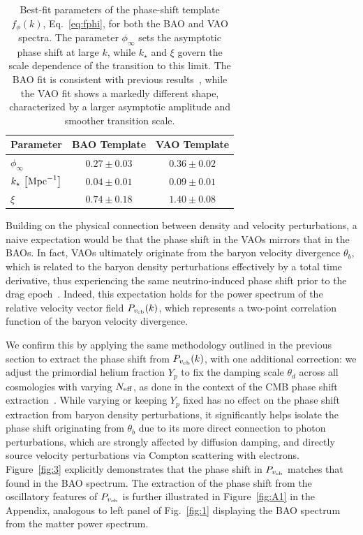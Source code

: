 \documentclass[floats,floatfix,showpacs,amssymb,prd,twocolumn,superscriptaddress,nofootinbib,reprint,preprintnumbers]{revtex4-2}
\begin{document}
\begin{table}
	\centering
	\begin{tabular}{l c @{\hskip 1em} c}
			\toprule
		Parameter 				& {BAO Template} & 							{VAO Template}								\\
			\midrule[0.065em]
		$\phi_\infty$ 				& $0.27 \pm 0.03$ & $0.36 \pm 0.02$				 		\\
		$k_\star\,\left[\rm{Mpc}^{-1}\right]$				& $0.04 \pm 0.01$ &	 $0.09 \pm 0.01$				\\
		$\xi$ 		& $0.74\pm 0.18$ & $1.40\pm 0.08$ \\

			\bottomrule
	\end{tabular}
	\caption{Best-fit parameters of the phase-shift template $f_\phi(k)$, Eq.~\eqref{eq:fphi}, for both the BAO and VAO spectra. The parameter $\phi_\infty$ sets the asymptotic phase shift at large $k$, while $k_\star$ and $\xi$ govern the scale dependence of the transition to this limit. The BAO fit is consistent with previous results~\cite{Baumann:2017gkg}, while the VAO fit shows a markedly different shape, characterized by a larger asymptotic amplitude and smoother transition scale.}
\label{tab:phase_templates}
\end{table}


\noindent Building on the physical connection between density and velocity perturbations, a naive expectation would be that the phase shift in the VAOs mirrors that in the BAOs. In fact, VAOs ultimately originate from the baryon velocity divergence $\theta_b$, which is related to the baryon density perturbations effectively by a total time derivative, thus experiencing the same neutrino-induced phase shift prior to the drag epoch~\cite{Green:2020fjb, Montefalcone:2025unv}. Indeed, this expectation holds for the power spectrum of the relative velocity vector field $P_{v_{\rm cb}}(k)$, which represents a two-point correlation function of the baryon velocity divergence. 

We confirm this by applying the same methodology outlined in the previous section to extract the phase shift from $P_{v_{\rm cb}}(k)$, with one additional correction: we adjust the primordial helium fraction $Y_p$ to fix the damping scale $\theta_d$ across all cosmologies with varying $N_{\rm eff}$, as done in the context of the CMB phase shift extraction~\cite{Follin:2015hya, Montefalcone:2025unv}. While varying or keeping $Y_p$ fixed has no effect on the phase shift extraction from baryon density perturbations, it significantly helps isolate the phase shift originating from $\theta_b$ due to its more direct connection to photon perturbations, which are strongly affected by diffusion damping, and directly source velocity perturbations via Compton scattering with electrons. Figure~\ref{fig:3} explicitly demonstrates that the phase shift in $P_{v_{\rm cb}}$ matches that found in the BAO spectrum. The extraction of the phase shift from the oscillatory features of $P_{v_{\rm cb}}$ is further illustrated in Figure~\ref{fig:A1} in the Appendix, analogous to left panel of Fig.~\ref{fig:1} displaying the BAO spectrum from the matter power spectrum. 
\end{document}
